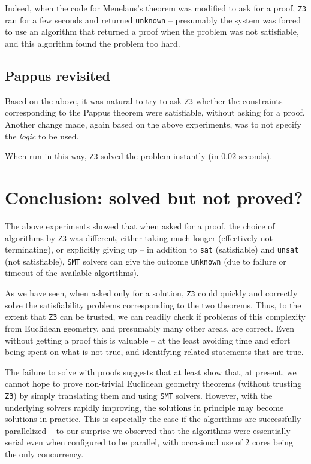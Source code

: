 \documentclass{amsart}
\theoremstyle{plain}
\theoremstyle{definition}
\theoremstyle{remark}
\begin{document}
Indeed, when the code for Menelaus's theorem was modified to ask for a
proof, \texttt{Z3} ran for a few seconds and returned \texttt{unknown} --
presumably the system was forced to use an algorithm that returned a
proof when the problem was not satisfiable, and this algorithm found the
problem too hard.

\subsection{Pappus revisited}

Based on the above, it was natural to try to ask \texttt{Z3} whether the
constraints corresponding to the Pappus theorem were satisfiable,
without asking for a proof. Another change made, again based on the
above experiments, was to not specify the \emph{logic} to be used.

When run in this way, \texttt{Z3} solved the problem instantly (in 0.02 seconds).



\section{Conclusion: solved but not proved?}

The above experiments showed that when asked for a proof, the choice of algorithms by \texttt{Z3}
was different, either taking much longer (effectively not terminating),
or explicitly giving up -- in addition to \texttt{sat} (satisfiable) and
\texttt{unsat} (not satisfiable), \texttt{SMT} solvers can give the outcome
\texttt{unknown} (due to failure or timeout of the available
algorithms).

As we have seen, when asked only for a solution, \texttt{Z3} could quickly and correctly solve the
satisfiability problems corresponding to the two theorems.
Thus, to the extent that \texttt{Z3} can be trusted, we can readily check if
problems of this complexity from Euclidean geometry, and presumably many
other areas, are correct. Even without getting a proof this is valuable
-- at the least avoiding time and effort being spent on what is not
true, and identifying related statements that are true.

The failure to solve with proofs suggests that at least show that, at present, we cannot hope to
prove non-trivial Euclidean geometry theorems (without trusting \texttt{Z3}) by simply translating
them and using \texttt{SMT} solvers. However, with the underlying solvers rapidly
improving, the solutions in principle may become solutions in practice.
This is especially the case if the algorithms are successfully
parallelized -- to our surprise we observed that the algorithms were
essentially serial even when configured to be parallel, with occasional
use of \(2\) cores being the only concurrency.
\end{document}
